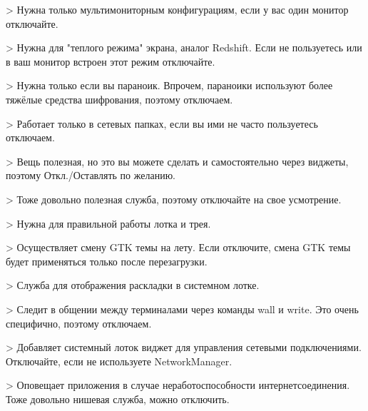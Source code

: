 \documentclass[letterpaper,10pt,russian,openany]{sphinxmanual}
\begin{document}
\sphinxAtStartPar
{} \sphinxhyphen{}> Нужна только мультимониторным конфигурациям,
если у вас один монитор \sphinxhyphen{} отключайте.

\sphinxAtStartPar
{} \sphinxhyphen{}> Нужна для "теплого режима" экрана, аналог Redshift.
Если не пользуетесь или в ваш монитор встроен этот режим \sphinxhyphen{} отключайте.

\sphinxAtStartPar
{} \sphinxhyphen{}> Нужна только если вы параноик.
Впрочем, параноики используют более тяжёлые средства шифрования, поэтому отключаем.

\sphinxAtStartPar
{} \sphinxhyphen{}> Работает только в сетевых папках,
если вы ими не часто пользуетесь \sphinxhyphen{} отключаем.

\sphinxAtStartPar
{} \sphinxhyphen{}> Вещь полезная, но это вы можете сделать и самостоятельно через виджеты,
поэтому Откл./Оставлять по желанию.

\sphinxAtStartPar
{} \sphinxhyphen{}> Тоже довольно полезная служба, поэтому отключайте на свое усмотрение.

\sphinxAtStartPar
{} \sphinxhyphen{}> Нужна для правильной работы лотка и трея.

\sphinxAtStartPar
{} \sphinxhyphen{}> Осуществляет смену GTK темы на лету.
Если отключите, смена GTK темы будет применяться только после перезагрузки.

\sphinxAtStartPar
{} \sphinxhyphen{}> Служба для отображения раскладки в системном лотке.

\sphinxAtStartPar
{} \sphinxhyphen{}> Следит в общении между терминалами через команды wall и write.
Это очень специфично, поэтому отключаем.

\sphinxAtStartPar
{} \sphinxhyphen{}> Добавляет системный лоток виджет для управления сетевыми подключениями.
Отключайте, если не используете NetworkManager.

\sphinxAtStartPar
{} \sphinxhyphen{}> Оповещает приложения в случае неработоспособности интернет\sphinxhyphen{}соединения.
Тоже довольно нишевая служба, можно отключить.
\end{document}
